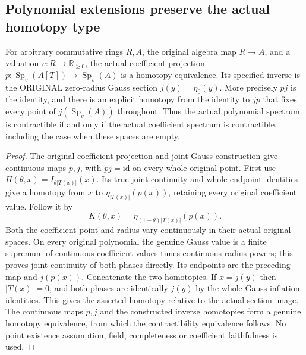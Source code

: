 \subsection{Polynomial extensions preserve the actual homotopy type}
\begin{theorem}
\label{analytic:polynomial-spectrum-homotopy-equivalence}
\leanok
{}
For arbitrary commutative rings $R,A$, the original algebra map $R\to A$,
and a valuation $v:R\to\mathbb R_{\geq0}$, the actual coefficient
projection $p:\operatorname{Sp}_v(A[T])\to\operatorname{Sp}_v(A)$ is a
homotopy equivalence. Its specified inverse is the ORIGINAL zero-radius
Gauss section $j(y)=\eta_0(y)$. More precisely $pj$ is the identity, and
there is an explicit homotopy from the identity to $jp$ that fixes every
point of $j(\operatorname{Sp}_v(A))$ throughout. Thus the actual polynomial
spectrum is contractible if and only if the actual coefficient spectrum
is contractible, including the case when these spaces are empty.
\end{theorem}
\begin{proof}
The original coefficient projection and joint Gauss construction give
continuous maps $p,j$, with $pj=\mathrm{id}$ on every whole original point.
First use $H(\theta,x)=I_{\theta|T(x)|}(x)$. Its true joint continuity
and whole endpoint identities give a homotopy from $x$ to
$\eta_{|T(x)|}(p(x))$, retaining every original coefficient value.
Follow it by
\[
 K(\theta,x)=\eta_{(1-\theta)|T(x)|}(p(x)).
\]
Both the coefficient point and radius vary continuously in their actual
original spaces. On every original polynomial the genuine Gauss value is a
finite supremum of continuous coefficient values times continuous radius
powers; this proves joint continuity of both phases directly. Its endpoints are the preceding map and $j(p(x))$. Concatenate
the two homotopies. If $x=j(y)$ then $|T(x)|=0$, and both phases are
identically $j(y)$ by the whole Gauss inflation identities. This gives
the asserted homotopy relative to the actual section image. The continuous
maps $p,j$ and the constructed inverse homotopies form a genuine homotopy
equivalence, from which the contractibility equivalence follows. No point
existence assumption, field, completeness or coefficient faithfulness is used.
\end{proof}

